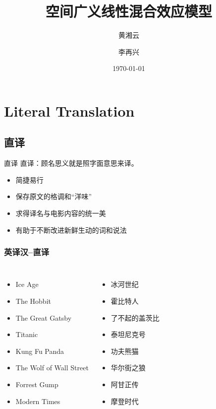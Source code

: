 \documentclass[xcolor=x11names,compress]{ctexbeamer}
\title{空间广义线性混合效应模型}
\author
{黄湘云 \and 李再兴}
\institute
{
  理学院\\
  中国矿业大学（北京）
}
\date{\today}
\begin{document}
\maketitle


\section[Literal Translation]{Literal Translation}
\subsection{直译}

\begin{frame}{直译}
直译：顾名思义就是照字面意思来译。
\begin{itemize}
\item 简捷易行
\item 保存原文的格调和“洋味”
\item 求得译名与电影内容的统一美
\item 有助于不断改进新鲜生动的词和说法
\end{itemize}

\end{frame}

\begin{frame}
\frametitle{英译汉--直译}
\begin{columns}

\begin{itemize}
\item Ice Age
\item The Hobbit
\item The Great Gatsby
\item Titanic
\item Kung Fu Panda
\item The Wolf of Wall Street
\item Forrest Gump
\item Modern Times
\end{itemize}
\pause
{}
\begin{itemize}
\item 冰河世纪
\item 霍比特人
\item 了不起的盖茨比
\item 泰坦尼克号
\item 功夫熊猫
\item 华尔街之狼
\item 阿甘正传
\item 摩登时代
\end{itemize}
\end{columns}
\end{frame}
\end{document}

